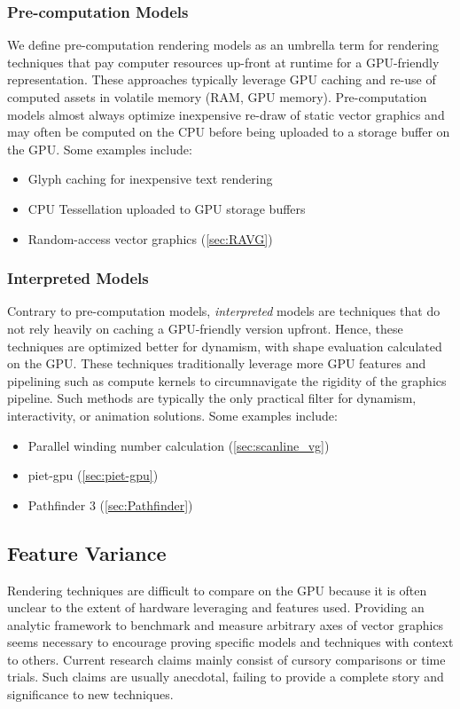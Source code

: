 \subsubsection{Pre-computation Models}\label{sec:precomp_models}
We define pre-computation rendering models as an umbrella term for rendering techniques that pay computer resources up-front at runtime for a GPU-friendly representation. These approaches typically leverage GPU caching and re-use of computed assets in volatile memory (RAM, GPU memory). Pre-computation models almost always optimize inexpensive re-draw of static vector graphics and may often be computed on the CPU before being uploaded to a storage buffer on the GPU. Some examples include:
\begin{itemize}
    \item Glyph caching for inexpensive text rendering
    \item CPU Tessellation uploaded to GPU storage buffers
    \item Random-access vector graphics (\cref{sec:RAVG})
\end{itemize}

\subsubsection{Interpreted Models}\label{sec:interpreted_models}

Contrary to pre-computation models, \textit{interpreted} models are techniques that do not rely heavily on caching a GPU-friendly version upfront. Hence, these techniques are optimized better for dynamism, with shape evaluation calculated on the GPU. These techniques traditionally leverage more GPU features and pipelining such as compute kernels to circumnavigate the rigidity of the graphics pipeline. Such methods are typically the only practical filter for dynamism, interactivity, or animation solutions. Some examples include:
\begin{itemize}
    \item Parallel winding number calculation (\cref{sec:scanline_vg})
    \item piet-gpu (\cref{sec:piet-gpu})
    \item Pathfinder 3 (\cref{sec:Pathfinder})
\end{itemize}

\subsection{Feature Variance}
Rendering techniques are difficult to compare on the GPU because it is often unclear to the extent of hardware leveraging and features used. Providing an analytic framework to benchmark and measure arbitrary axes of vector graphics seems necessary to encourage proving specific models and techniques with context to others. Current research claims mainly consist of cursory comparisons or time trials. Such claims are usually anecdotal, failing to provide a complete story and significance to new techniques.\medskip

